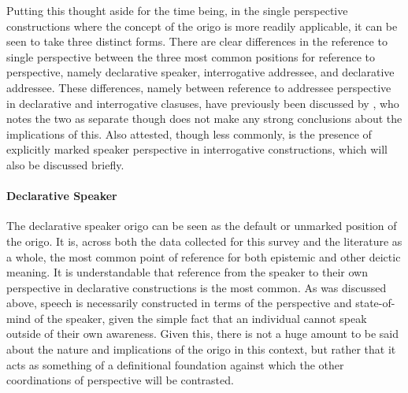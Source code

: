 Putting this thought aside for the time being, in the single perspective constructions where the concept of the origo is more readily applicable, it can be seen to take three distinct forms. There are clear differences in the reference to single perspective between the three most common positions for reference to perspective, namely declarative speaker, interrogative addressee, and declarative addressee. These differences, namely between reference to addressee perspective in declarative and interrogative clasuses, have previously been discussed by , who notes the two as separate though does not make any strong conclusions about the implications of this. Also attested, though less commonly, is the presence of explicitly marked speaker perspective in interrogative constructions, which will also be discussed briefly.

\paragraph{Declarative Speaker}
The declarative speaker origo can be seen as the default or unmarked position of the origo. It is, across both the data collected for this survey and the literature as a whole, the most common point of reference for both epistemic and other deictic meaning. It is understandable that reference from the speaker to their own perspective in declarative constructions is the most common. As was discussed above, speech is necessarily constructed in terms of the perspective and state-of-mind of the speaker, given the simple fact that an individual cannot speak outside of their own awareness. Given this, there is not a huge amount to be said about the nature and implications of the origo in this context, but rather that it acts as something of a definitional foundation against which the other coordinations of perspective will be contrasted.
